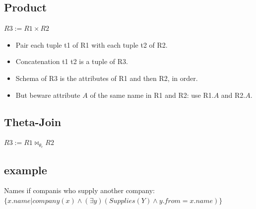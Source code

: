 \documentclass[a4paper]{article}
\begin{document}
        \subsection{Product}
            \begin{center}
                $R3:= R1 \times R2$
            \end{center}
            \begin{itemize}
                \item Pair each tuple t1 of R1 with each tuple t2 of R2.
                \item Concatenation t1 t2 is a tuple of R3.
                \item Schema of R3 is the attributes of R1 and then R2, in order.
                \item But beware attribute $A$ of the same name in R1 and R2: use R1.$A$ and R2.$A$.
            \end{itemize}
        \subsection{Theta-Join}
            \begin{center}
                $R3:= R1 \bowtie_{\theta}_{c} R2$
            \end{center}        



        \subsection{example}
            Names if companis who supply another company: \\
            $ \{x.name | company(x) \wedge (\exists y)(Supplies(Y) \wedge y.from = 
            x.name)\}$

                


    
\end{document}
